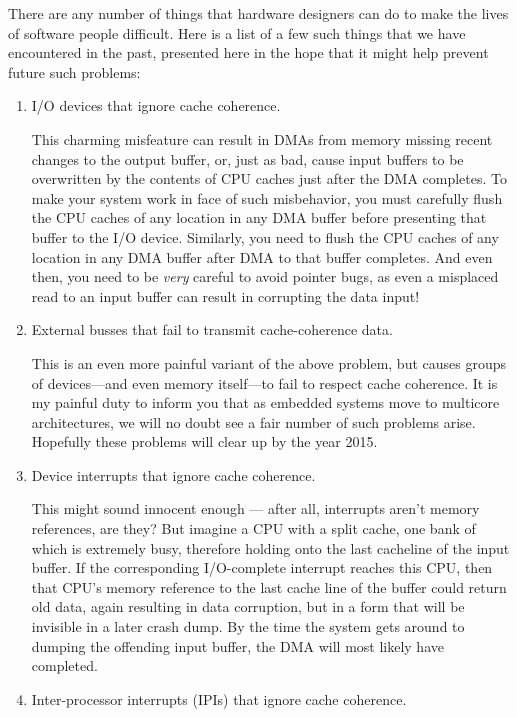 There are any number of things that hardware designers can do
to make the lives of software people difficult.
Here is a list of a few such things that we have encountered in
the past, presented here in the hope that it might help prevent
future such problems:
\begin{enumerate}
\item	I/O devices that ignore cache coherence.

	This charming misfeature can result in DMAs from memory
	missing recent changes to the output buffer, or, just as
	bad, cause input buffers to be overwritten by the contents
	of CPU caches just after the DMA completes.
	To make your system work in face of such misbehavior,
	you must carefully flush the CPU caches of any location
	in any DMA buffer before presenting that buffer to the
	I/O device.
	Similarly, you need to flush the CPU caches of any location
	in any DMA buffer after DMA to that buffer completes.
	And even then, you need to be \emph{very} careful to avoid
	pointer bugs, as even a misplaced read to an input buffer
	can result in corrupting the data input!

\item	External busses that fail to transmit cache-coherence data.
	
	This is an even more painful variant of the above problem,
	but causes groups of devices---and even memory itself---to
	fail to respect cache coherence.
	It is my painful duty to inform you that as embedded systems
	move to multicore architectures, we will no doubt see a fair
	number of such problems arise.
	Hopefully these problems will clear up by the year 2015.

\item	Device interrupts that ignore cache coherence.

	This might sound innocent enough --- after all, interrupts
	aren't memory references, are they?
	But imagine a CPU with a split cache, one bank of which is
	extremely busy, therefore holding onto the last cacheline
	of the input buffer.
	If the corresponding I/O-complete interrupt reaches this
	CPU, then that CPU's memory reference to the last cache
	line of the buffer could return old data, again resulting
	in data corruption, but in a form that will be invisible
	in a later crash dump.
	By the time the system gets around to dumping the offending
	input buffer, the DMA will most likely have completed.

\item	Inter-processor interrupts (IPIs) that ignore cache coherence.


\end{enumerate}
